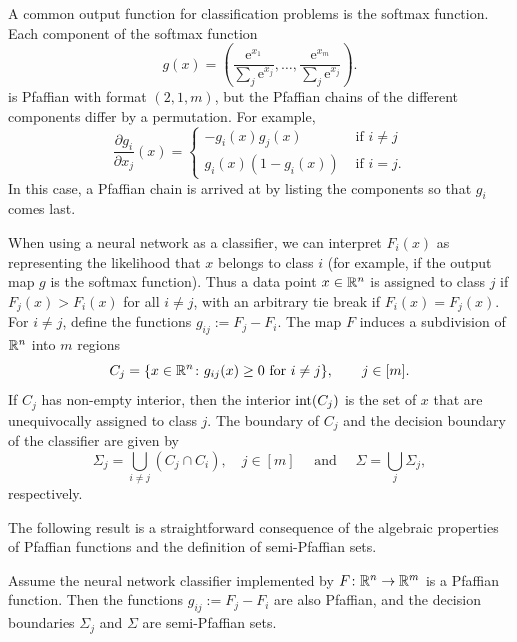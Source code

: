 \begin{example}[Softmax]\label{ex:softmax}
A common output function for classification problems is the softmax function. Each component of the softmax function
\begin{equation}\label{eq:softmax}
  g(x) = \left(\frac{\mathrm{e}^{x_1}}{\sum_{j}\mathrm{e}^{x_j}}, \dots, \frac{\mathrm{e}^{x_m}}{\sum_{j}\mathrm{e}^{x_j}}\right).
\end{equation}
is Pfaffian with format $(2,1,m)$, but the Pfaffian chains of the different components differ by a permutation. For example, 
\begin{equation*}
  \frac{\partial g_i}{\partial x_j}(x) = \begin{cases}
    -g_i(x)g_j(x) & \text{ if } i\neq j\\
    g_i(x)(1-g_i(x)) & \text{ if } i=j.
  \end{cases}
\end{equation*}
In this case, a Pfaffian chain is arrived at by listing the components so that $g_i$ comes last.
\end{example}

When using a neural network as a classifier, we can interpret $F_i(x)$ as representing the likelihood that $x$ belongs to class $i$ (for example, if the output map $g$ is the softmax function). Thus a data point $x\in \mathbb{R}^n$ is assigned to class $j$ if $F_j(x)>F_i(x)$ for all $i\neq j$, with an arbitrary tie break if $F_i(x)=F_j(x)$.
For $i\neq j$, define the functions
$g_{ij} := F_j-F_i$. The map $F$ induces a subdivision of $\mathbb{R}^n$ into $m$ regions
\begin{equation*}
 C_j = \{x\in \mathbb{R}^n \colon g_{ij}(x) \geq 0 \text{ for } i\neq j\}, \quad \quad j\in [m].
\end{equation*}
If $C_j$ has non-empty interior, then the interior ${\operatorname{int}}(C_j)$ is the set of $x$ that are unequivocally assigned to class $j$. 
The boundary of $C_j$ and the decision boundary of the classifier are given by
\begin{equation*}
 \Sigma_j = \bigcup_{i\neq j} (C_j\cap C_i), \quad j\in [m] \quad \text{ and }  \quad \Sigma = \bigcup_j \Sigma_j,
\end{equation*}
respectively. 

The following result is a straightforward consequence of the algebraic properties of Pfaffian functions and the definition of semi-Pfaffian sets.

\begin{proposition}\label{prop:decision-pfaffian}
Assume the neural network classifier implemented by $F\colon \mathbb{R}^n\to \mathbb{R}^m$ is a Pfaffian function. Then the functions $g_{ij}:=F_j-F_i$ are also Pfaffian, and the decision boundaries $\Sigma_j$ and $\Sigma$ are semi-Pfaffian sets. 
\end{proposition}


